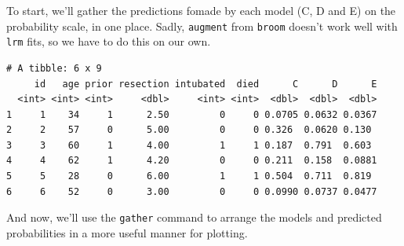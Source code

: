 \documentclass[]{book}
\newenvironment{Shaded}{\begin{snugshade}}{\end{snugshade}}
\newcommand{\KeywordTok}[1]{\textcolor[rgb]{0.13,0.29,0.53}{\textbf{#1}}}
\newcommand{\DataTypeTok}[1]{\textcolor[rgb]{0.13,0.29,0.53}{#1}}
\newcommand{\DecValTok}[1]{\textcolor[rgb]{0.00,0.00,0.81}{#1}}
\newcommand{\StringTok}[1]{\textcolor[rgb]{0.31,0.60,0.02}{#1}}
\newcommand{\OperatorTok}[1]{\textcolor[rgb]{0.81,0.36,0.00}{\textbf{#1}}}
\newcommand{\NormalTok}[1]{#1}
\theoremstyle{definition}
\theoremstyle{definition}
\theoremstyle{definition}
\theoremstyle{remark}
\begin{document}
To start, we'll gather the predictions fomade by each model (C, D and E)
on the probability scale, in one place. Sadly, \texttt{augment} from
\texttt{broom} doesn't work well with \texttt{lrm} fits, so we have to
do this on our own.

\begin{Shaded}
\end{Shaded}

\begin{verbatim}
# A tibble: 6 x 9
     id   age prior resection intubated  died      C      D      E
  <int> <int> <int>     <dbl>     <int> <int>  <dbl>  <dbl>  <dbl>
1     1    34     1      2.50         0     0 0.0705 0.0632 0.0367
2     2    57     0      5.00         0     0 0.326  0.0620 0.130 
3     3    60     1      4.00         1     1 0.187  0.791  0.603 
4     4    62     1      4.20         0     0 0.211  0.158  0.0881
5     5    28     0      6.00         1     1 0.504  0.711  0.819 
6     6    52     0      3.00         0     0 0.0990 0.0737 0.0477
\end{verbatim}

And now, we'll use the \texttt{gather} command to arrange the models and
predicted probabilities in a more useful manner for plotting.

\begin{Shaded}
\end{Shaded}
\end{document}
